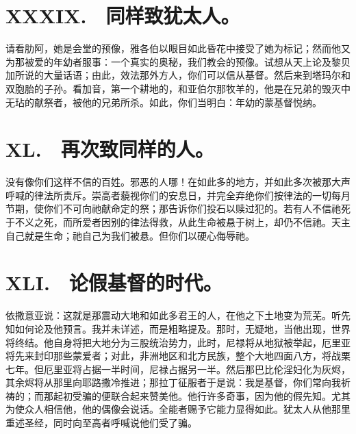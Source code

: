 \section{XXXIX.　同样致犹太人。}

请看肋阿，她是会堂的预像，雅各伯以眼目如此昏花中接受了她为标记；然而他又为那被爱的年幼者服事：一个真实的奥秘，我们教会的预像。试想从天上论及黎贝加所说的大量话语；由此，效法那外方人，你们可以信从基督。然后来到塔玛尔和双胞胎的子孙。看加音，第一个耕地的，和亚伯尔那牧羊的，他是在兄弟的毁灭中无玷的献祭者，被他的兄弟所杀。如此，你们当明白：年幼的蒙基督悦纳。\par


\section{XL.　再次致同样的人。}

没有像你们这样不信的百姓。邪恶的人哪！在如此多的地方，并如此多次被那大声呼喊的律法所责斥。崇高者藐视你们的安息日，并完全弃绝你们按律法的一切每月节期，使你们不可向祂献命定的祭；那告诉你们投石以赎过犯的。若有人不信祂死于不义之死，而所爱者因别的律法得救，从此生命被悬于树上，却仍不信祂。天主自己就是生命；祂自己为我们被悬。但你们以硬心侮辱祂。\par


\section{XLI.　论假基督的时代。}

依撒意亚说：这就是那震动大地和如此多君王的人，在他之下土地变为荒芜。听先知如何论及他预言。我并未详述，而是粗略提及。那时，无疑地，当他出现，世界将终结。他自身将把大地分为三股统治势力，此时，尼禄将从地狱被举起，厄里亚将先来封印那些蒙爱者；对此，非洲地区和北方民族，整个大地四面八方，将战栗七年。但厄里亚将占据一半时间，尼禄占据另一半。然后那巴比伦淫妇化为灰烬，其余烬将从那里向耶路撒冷推进；那拉丁征服者于是说：我是基督，你们常向我祈祷的；而那起初受骗的便联合起来赞美他。他行许多奇事，因为他的假先知。尤其为使众人相信他，他的偶像会说话。全能者赐予它能力显得如此。犹太人从他那里重述圣经，同时向至高者呼喊说他们受了骗。\par


